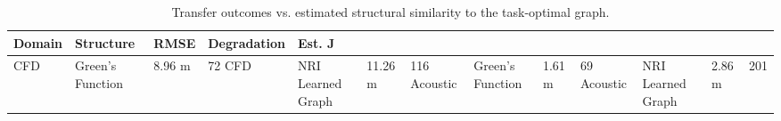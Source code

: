 \begin{table}
\caption{Transfer outcomes vs. estimated structural similarity to the task-optimal graph.}
\label{tab:transfer-jaccard}
\begin{tabular}{lllll}
\toprule
Domain & Structure & RMSE & Degradation & Est. J \\
\midrule
CFD & Green's Function & 8.96 m & 72%
CFD & NRI Learned Graph & 11.26 m & 116%
Acoustic & Green's Function & 1.61 m & 69%
Acoustic & NRI Learned Graph & 2.86 m & 201%
\bottomrule
\end{tabular}
\end{table}
